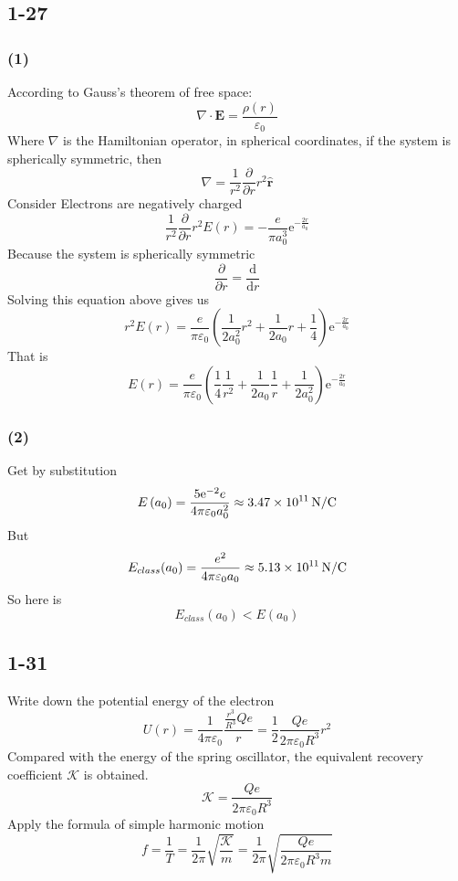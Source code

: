 \documentclass[a4paper,11pt]{amsart}
\theoremstyle{definition}
\begin{document}
	\subsection*{1-27}
	\subsubsection*{(1)}
	According to Gauss's theorem of free space:
	$$
	\nabla \cdot \boldsymbol{E}=\frac{\rho \left( r \right)}{\varepsilon _0}
	$$
	Where $\nabla$ is the Hamiltonian operator, in spherical coordinates, if the system is spherically symmetric, then
	$$
	\nabla =\frac{1}{r^2}\frac{\partial}{\partial r}r^2\hat{\boldsymbol{r}}
	$$
	Consider Electrons are negatively charged
	$$
	\frac{1}{r^2}\frac{\partial}{\partial r}r^2E\left( r \right) =-\frac{e}{\pi a_{0}^{3}}\mathrm{e}^{-\tfrac{2r}{a_0}}
	$$
	Because the system is spherically symmetric
	$$
	\frac{\partial}{\partial r}=\frac{\mathrm{d}}{\mathrm{d}r}
	$$
	Solving this equation above gives us
	$$
	r^2E\left( r \right) =\frac{e}{\pi\varepsilon_0}\left( \frac{1}{2a_{0}^{2}}r^2+\frac{1}{2a_0}r+\frac{1}{4} \right) \mathrm{e}^{-\tfrac{2r}{a_0}}
	$$
	That is
	$$
	E\left( r \right) =\frac{e}{\pi\varepsilon_0}\left( \frac{1}{4}\frac{1}{r^2}+\frac{1}{2a_0}\frac{1}{r}+\frac{1}{2a_{0}^{2}} \right) \mathrm{e}^{-\tfrac{2r}{a_0}}
	$$
	\subsubsection*{(2)}	
	Get by substitution
	$$
	E\left( a_0 \right) =\frac{5\mathrm{e}^{-2}e}{4\pi \varepsilon _0a_{0}^{2}}\approx3.47\times10^{11}\thinspace \mathrm{N/C}
	$$
	But
	$$
	E_{class}(a_0)=\frac{e^2}{4\pi \varepsilon _0a_{0}}\approx5.13\times10^{11}\thinspace \mathrm{N/C}
	$$
	So here is
	$$
	E_{class}(a_0)<E(a_0)
	$$
	\subsection*{1-31}
	Write down the potential energy of the electron
	$$
	U\left( r \right) =\frac{1}{4\pi \varepsilon _0}\frac{\tfrac{r^3}{R^3}Qe}{r}=\frac{1}{2}\frac{Qe}{2\pi \varepsilon _0R^3}r^2
	$$
	Compared with the energy of the spring oscillator, the equivalent recovery coefficient $\mathcal{K}$ is obtained.
	$$
	\mathcal{K} =\frac{Qe}{2\pi \varepsilon _0R^3}
	$$
	Apply the formula of simple harmonic motion
	$$
	f=\dfrac{1}{T}=\dfrac{1}{2\pi}\sqrt{\dfrac{\mathcal{K}}{m}}=\frac{1}{2\pi}\sqrt{\frac{Qe}{2\pi \varepsilon _0R^3m}}
	$$
\end{document}
